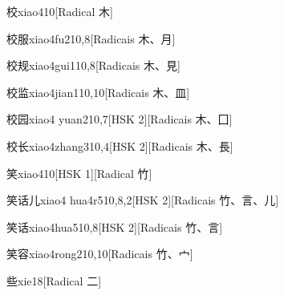 \begin{entry}{校}{xiao4}{10}[Radical ⽊]
\end{entry}

\begin{entry}{校服}{xiao4fu2}{10,8}[Radicais ⽊、⽉]
\end{entry}

\begin{entry}{校规}{xiao4gui1}{10,8}[Radicais ⽊、⾒]
\end{entry}

\begin{entry}{校监}{xiao4jian1}{10,10}[Radicais ⽊、⽫]
\end{entry}

\begin{entry}{校园}{xiao4 yuan2}{10,7}[HSK 2][Radicais ⽊、⼞]
\end{entry}

\begin{entry}{校长}{xiao4zhang3}{10,4}[HSK 2][Radicais ⽊、⾧]
\end{entry}

\begin{entry}{笑}{xiao4}{10}[HSK 1][Radical ⽵]
\end{entry}

\begin{entry}{笑话儿}{xiao4 hua4r5}{10,8,2}[HSK 2][Radicais ⽵、⾔、⼉]
\end{entry}

\begin{entry}{笑话}{xiao4hua5}{10,8}[HSK 2][Radicais ⽵、⾔]
\end{entry}

\begin{entry}{笑容}{xiao4rong2}{10,10}[Radicais ⽵、⼧]
\end{entry}

\begin{entry}{些}{xie1}{8}[Radical ⼆]
\end{entry}

